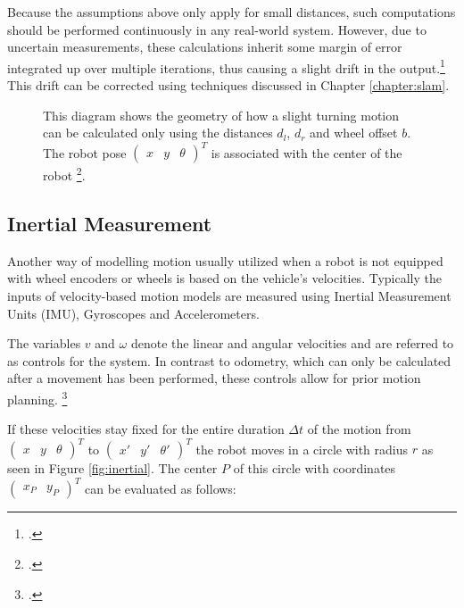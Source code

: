 Because the assumptions above only apply for small distances, such computations should be performed continuously in any real-world system. However, due to uncertain measurements, these calculations inherit some margin of error integrated up over multiple iterations, thus causing a slight drift in the output.\footcite[Pages 69 - 77]{ben2017elements} 
This drift can be corrected using techniques discussed in Chapter \ref{chapter:slam}.

\begin{figure}
	\centering
	
	\caption{
		This diagram shows the geometry of how a slight turning motion can be calculated only using the distances $d_{l}$, $d_{r}$ and wheel offset $b$.
		The robot pose 
		$
			\begin{pmatrix}
				x &
				y &
				\theta 
			\end{pmatrix}^{T}
		$
		is associated with the center of the robot \footcite{ben2017elements}.
	}
	\label{fig:odom}
\end{figure}


\subsection{Inertial Measurement}
Another way of modelling motion usually utilized when a robot is not equipped with wheel encoders or wheels is based on the vehicle's velocities. Typically the inputs of velocity-based motion models are measured using Inertial Measurement Units (IMU), Gyroscopes and Accelerometers. 

The variables $v$ and $\omega$ denote the linear and angular velocities and are referred to as controls for the system. 
In contrast to odometry, which can only be calculated after a movement has been performed, these controls allow for prior motion planning. \footcite[Pages 92 - 99]{thrun2002probabilisticRobotics}

If these velocities stay fixed for the entire duration $\Delta t$ of the motion from 
$\begin{pmatrix} x & y & \theta \end{pmatrix}^{T}$
to
$\begin{pmatrix} x' & y' & \theta' \end{pmatrix}^{T}$
the robot moves in a circle with radius $r$ as seen in Figure \ref{fig:inertial}. The center $P$ of this circle with coordinates 
$
\begin{pmatrix}
	x_{P} & y_{P}
\end{pmatrix}
^{T}
$
can be evaluated as follows:

